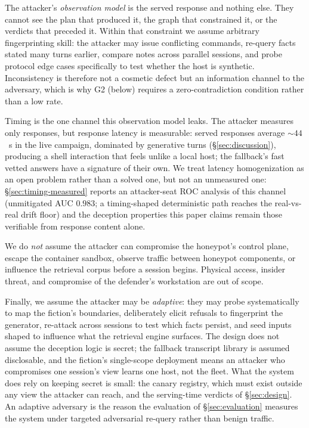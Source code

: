 The attacker's \emph{observation model} is the served response and
nothing else. They cannot see the plan that produced it, the graph that
constrained it, or the verdicts that preceded it. Within that constraint
we assume arbitrary fingerprinting skill: the attacker may issue
conflicting commands, re-query facts stated many turns earlier, compare
notes across parallel sessions, and probe protocol edge cases
specifically to test whether the host is synthetic. Inconsistency is
therefore not a cosmetic defect but an information channel to the
adversary, which is why G2 (below) requires a zero-contradiction
condition rather than a low rate.

Timing is the one channel this observation model leaks. The attacker
measures only responses, but response latency is measurable: served
responses average ${\sim}44$~s in the live campaign, dominated by
generative turns (\S\ref{sec:discussion}), producing a shell
interaction that feels unlike a local host; the
fallback's fast vetted answers have a signature of their own. We treat
latency homogenization as an open problem rather than a solved one, but
not an unmeasured one: \S\ref{sec:timing-measured} reports an
attacker-seat ROC analysis of this channel (unmitigated AUC $0.983$; a
timing-shaped deterministic path reaches the real-vs-real drift floor)
and the deception properties this paper claims remain those verifiable
from response content alone.

We do \emph{not} assume the attacker can compromise the honeypot's
control plane, escape the container sandbox, observe traffic between
honeypot components, or influence the retrieval corpus before a session
begins. Physical access, insider threat, and compromise of the defender's
workstation are out of scope.

Finally, we assume the attacker may be \emph{adaptive}: they may probe
systematically to map the fiction's boundaries, deliberately elicit
refusals to fingerprint the generator, re-attack across sessions to test
which facts persist, and seed inputs shaped to influence what the
retrieval engine surfaces. The design does not assume the deception
logic is secret; the fallback transcript library is assumed
disclosable, and the fiction's single-scope deployment means an attacker
who compromises one session's view learns one host, not the fleet. What
the system does rely on keeping secret is small: the canary registry,
which must exist outside any view the attacker can reach, and the
serving-time verdicts of \S\ref{sec:design}. An adaptive adversary is
the reason the evaluation of \S\ref{sec:evaluation} measures the system
under targeted adversarial re-query rather than benign traffic.

